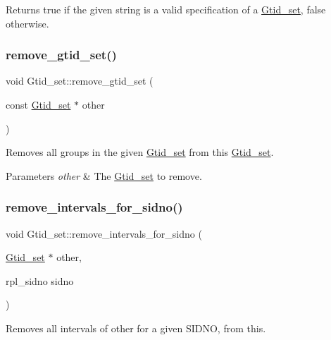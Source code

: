 Returns true if the given string is a valid specification of a \mbox{\hyperlink{classGtid__set}{Gtid\+\_\+set}}, false otherwise. \mbox{\label{classGtid__set_a6ed8e71d84efbc22bc589897b7318751}} 
\subsubsection{\texorpdfstring{remove\+\_\+gtid\+\_\+set()}{remove\_gtid\_set()}}
{\footnotesize\ttfamily void Gtid\+\_\+set\+::remove\+\_\+gtid\+\_\+set (\begin{DoxyParamCaption}\item[{const \mbox{\hyperlink{classGtid__set}{Gtid\+\_\+set}} $\ast$}]{other }\end{DoxyParamCaption})}

Removes all groups in the given \mbox{\hyperlink{classGtid__set}{Gtid\+\_\+set}} from this \mbox{\hyperlink{classGtid__set}{Gtid\+\_\+set}}.


\begin{DoxyParams}{Parameters}
{\em other} & The \mbox{\hyperlink{classGtid__set}{Gtid\+\_\+set}} to remove. \\
\hline
\end{DoxyParams}
\mbox{\label{classGtid__set_ac51226ff8e814b700a353fef54763456}} 
\subsubsection{\texorpdfstring{remove\+\_\+intervals\+\_\+for\+\_\+sidno()}{remove\_intervals\_for\_sidno()}}
{\footnotesize\ttfamily void Gtid\+\_\+set\+::remove\+\_\+intervals\+\_\+for\+\_\+sidno (\begin{DoxyParamCaption}\item[{\mbox{\hyperlink{classGtid__set}{Gtid\+\_\+set}} $\ast$}]{other,  }\item[{rpl\+\_\+sidno}]{sidno }\end{DoxyParamCaption})}

Removes all intervals of \textquotesingle{}other\textquotesingle{} for a given S\+I\+D\+NO, from \textquotesingle{}this\textquotesingle{}.


